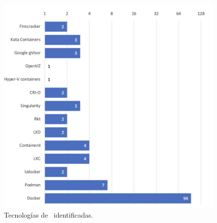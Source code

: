 \begin{figure}[H]
    \centering
    \includegraphics[scale=0.5]{./tablas-images/cp2/tecnologias-vbc.png}
    \caption{Tecnologías de \VBC\ identificadas.}\label{fig:tecnologias-vbc}
\end{figure}